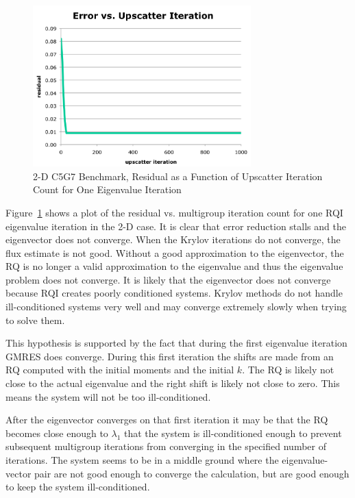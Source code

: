 \begin{figure}[!ht]	
  \begin{center}
    \includegraphics [width=0.75\textwidth, height=0.47\textheight ] {RQIConvergenceFail}
  \end{center}
  \caption{2-D C5G7 Benchmark, Residual as a Function of Upscatter Iteration Count for One Eigenvalue Iteration}
  \label{fig:RQIConvergenceFail}
\end{figure}
%
Figure~\ref{fig:RQIConvergenceFail} shows a plot of the residual vs. multigroup iteration count for one RQI eigenvalue iteration in the 2-D case. It is clear that error reduction stalls and the eigenvector does not converge. When the Krylov iterations do not converge, the flux estimate is not good. Without a good approximation to the eigenvector, the RQ is no longer a valid approximation to the eigenvalue and thus the eigenvalue problem does not converge. It is likely that the eigenvector does not converge because RQI creates poorly conditioned systems. Krylov methods do not handle ill-conditioned systems very well and may converge extremely slowly when trying to solve them. 

This hypothesis is supported by the fact that during the first eigenvalue iteration GMRES does converge. During this first iteration the shifts are made from an RQ computed with the initial moments and the initial $k$. The RQ is likely not close to the actual eigenvalue and the right shift is likely not close to zero. This means the system will not be too ill-conditioned. 

After the eigenvector converges on that first iteration it may be that the RQ becomes close enough to $\lambda_{1}$ that the system is ill-conditioned enough to prevent subsequent multigroup iterations from converging in the specified number of iterations. The system seems to be in a middle ground where the eigenvalue-vector pair are not good enough to converge the calculation, but are good enough to keep the system ill-conditioned. 

